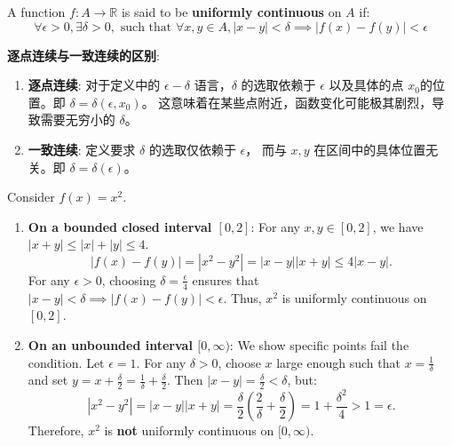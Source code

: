 \documentclass[
	UTF-8,
	11pt, %
	a4paper, %
]{LegrandOrangeBook}
\begin{document}
    
    \begin{definition}
    A function $f: A \to \mathbb{R}$ is said to be \textbf{uniformly continuous} on $A$ if:
    \[ \forall \epsilon > 0, \exists \delta > 0, \text{ such that } \forall x, y \in A, |x - y| < \delta \implies |f(x) - f(y)| < \epsilon \]
    \end{definition}

    \begin{remark}
    \textbf{逐点连续与一致连续的区别}:
    \begin{enumerate}
        \item \textbf{逐点连续}: 对于定义中的 $\epsilon - \delta$ 语言，$\delta$ 的选取依赖于 $\epsilon$ 以及具体的点 $x_0$的位置。即 $\delta = \delta(\epsilon, x_0)$。
        这意味着在某些点附近，函数变化可能极其剧烈，导致需要无穷小的 $\delta$。

        \item \textbf{一致连续}: 定义要求 $\delta$ 的选取仅依赖于 $\epsilon$，
        而与 $x, y$ 在区间中的具体位置无关。即 $\delta = \delta(\epsilon)$。

    \end{enumerate}
    \end{remark}

    \begin{example}
    Consider $f(x) = x^2$.
    \begin{enumerate}
        \item \textbf{On a bounded closed interval $[0, 2]$}:
        For any $x, y \in [0, 2]$, we have $|x + y| \le |x| + |y| \le 4$.
        \[ |f(x) - f(y)| = |x^2 - y^2| = |x - y||x + y| \le 4|x - y|. \]
        For any $\epsilon > 0$, choosing $\delta = \frac{\epsilon}{4}$ ensures that $|x - y| < \delta \implies |f(x) - f(y)| < \epsilon$.
        Thus, $x^2$ is uniformly continuous on $[0, 2]$.

        \item \textbf{On an unbounded interval $[0, \infty)$}:
        We show specific points fail the condition. Let $\epsilon = 1$. For any $\delta > 0$, choose $x$ large enough such that $x = \frac{1}{\delta}$ and set $y = x + \frac{\delta}{2} = \frac{1}{\delta} + \frac{\delta}{2}$.
        Then $|x - y| = \frac{\delta}{2} < \delta$, but:
        \[ |x^2 - y^2| = |x - y||x + y| = \frac{\delta}{2} \left( \frac{2}{\delta} + \frac{\delta}{2} \right) = 1 + \frac{\delta^2}{4} > 1 = \epsilon. \]
        Therefore, $x^2$ is \textbf{not} uniformly continuous on $[0, \infty)$.
    \end{enumerate}
    \end{example}
\end{document}
